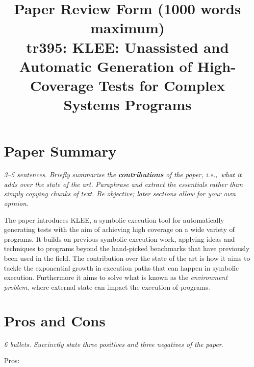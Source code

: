 \documentclass[11pt]{article}
\begin{document}

\title{Paper Review Form (1000 words maximum)\\
    tr395: KLEE: Unassisted and Automatic Generation of High-Coverage Tests for Complex Systems Programs \cite{KLEE}}

\maketitle

\section*{Paper Summary}

\textsl{3--5 sentences. Briefly summarise the {\bf contributions} of the paper,
i.e.,~what it adds over the state of the art. Paraphrase and extract the
essentials rather than simply copying chunks of text. Be objective; later
sections allow for your own opinion.}

The paper introduces KLEE, a symbolic execution tool for automatically
generating tests with the aim of achieving high coverage on a wide variety of
programs. It builds on previous symbolic execution work, applying ideas and
techniques to programs beyond the hand-picked benchmarks that have previously
been used in the field. The contribution over the state of the art is how it
aims to tackle the exponential growth in execution paths that can happen in
symbolic execution. Furthermore it aims to solve what is known as the
\textit{environment problem}, where external state can impact the execution of
programs.

\section*{Pros and Cons}

\textsl{6 bullets. Succinctly state three positives and three negatives of the
paper.}

Pros:
\end{document}
